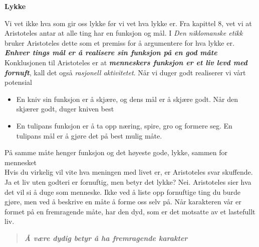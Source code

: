 \documentclass[11pt, a4paper]{article}
\newenvironment{sectionbox}[1][]{%
    \begin{sectionboxinner}
    \textbf{\large #1}
    \vspace{1pt}
    \newline
}{%
    \end{sectionboxinner}
}
\begin{document}
\begin{sectionbox}[Lykke]
    \begin{flushleft}
        Vi vet ikke hva som gir oss lykke før vi vet hva lykke er. Fra kapittel 8, vet vi at Aristoteles antar at alle ting har en funksjon og mål. I \textit{Den niklomanske etikk} bruker Aristoteles dette som et premiss for å argumentere for hva lykke er. \textbf{\textit{Enhver tings mål er å realisere sin funksjon på en god måte}}\\


        Konklusjonen til Aristoteles er at \textbf{\textit{menneskers funksjon er et liv levd med fornuft}}, kall det også \textit{rasjonell aktivitetet}. Når vi duger godt realiserer vi vårt potensial

        \begin{itemize}
            \item En kniv sin funksjon er å skjære, og dens mål er å skjære godt. Når den skjærer godt, duger kniven best
            \item En tulipans funksjon er å ta opp næring, spire, gro og formere seg. En tulipans mål er å gjøre det på best mulig måte.
        \end{itemize}
        På samme måte henger funksjon og det høyeste gode, lykke, sammen for mennesket\\

        Hvis du virkelig vil vite hva meningen med livet er, er Aristoteles svar skuffende. Ja et liv uten godteri er fornuftig, men betyr det lykke? Nei. Aristoteles sier hva det vil si å duge som menneske. Ikke ved å liste opp fornuftige ting du burde gjøre, men ved å beskrive en måte å forme oss selv på. Når karakteren vår er formet på en fremragende måte, har den dyd, som er det motsatte av et lastefullt liv.\\

        \begin{quote}
            \textbf{\textit{Å være dydig betyr å ha fremragende karakter}}
        \end{quote}


\end{flushleft}
\end{sectionbox}
\end{document}
